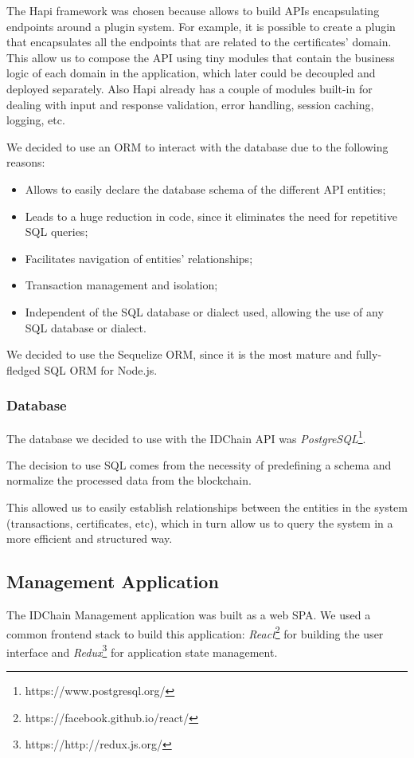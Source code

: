 The Hapi framework was chosen because allows to build APIs encapsulating endpoints around a plugin system.
For example, it is possible to create a plugin that encapsulates all the endpoints that are related to the certificates' domain.
This allow us to compose the API using tiny modules that contain the business logic of each domain in the application, which later could be decoupled and deployed separately.
Also Hapi already has a couple of modules built-in for dealing with input and response validation, error handling, session caching, logging, etc.

We decided to use an \ac{ORM} to interact with the database due to the following reasons:

\begin{itemize}
  \item Allows to easily declare the database schema of the different API entities;
  \item Leads to a huge reduction in code, since it eliminates the need for repetitive SQL queries;
  \item Facilitates navigation of entities' relationships;
  \item Transaction management and isolation;
  \item Independent of the SQL database or dialect used, allowing the use of any SQL database or dialect.
\end{itemize}

We decided to use the Sequelize ORM, since it is the most mature and fully-fledged SQL ORM for Node.js.

\subsubsection{Database}

The database we decided to use with the IDChain API was \textit{PostgreSQL}\footnote{https://www.postgresql.org/}.

The decision to use SQL comes from the necessity of predefining a schema and normalize the processed data from the blockchain.

This allowed us to easily establish relationships between the entities in the system (transactions, certificates, etc), which in turn allow us to query the system in a more efficient and structured way.

\subsection{Management Application}
The IDChain Management application was built as a web \ac{SPA}.
We used a common frontend stack to build this application: \textit{React}\footnote{https://facebook.github.io/react/} for building the user interface and \textit{Redux}\footnote{https://http://redux.js.org/} for application state management.


